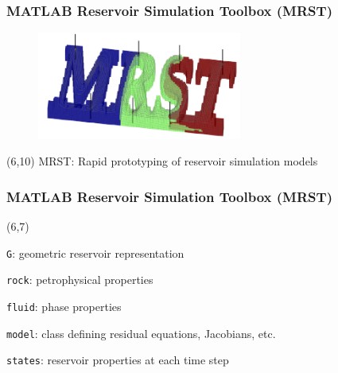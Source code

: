 \documentclass[screen, aspectratio=43]{beamer}
\newcommand{\myitemmark}{\raisebox{.75ex}{\scalebox{.6}{\protect\colorbox{ntnublue}{\protect}}}}
\newenvironment{prettyList}
{
  \begin{list}{\myitemmark}{\leftmargin=1.5em \itemindent=0em} 
}
{
  \end{list}
}
\begin{document}
{
\begin{frame}
  \frametitle{MATLAB Reservoir Simulation Toolbox (MRST)}
  
    \begin{figure}[h]
      \centering
      \vspace{-4em}\hspace{8em}\includegraphics[width = 0.6\textwidth]{figures/misc/mrstlogo}
    \end{figure}
     \begin{textblock}{9.5}(6,10)
    MRST: Rapid prototyping of reservoir simulation models \cite{krogstad2015mrst}
  \end{textblock}

\end{frame}
}

{
\begin{frame}
  \frametitle{MATLAB Reservoir Simulation Toolbox (MRST)}
  
  \begin{textblock}{9.5}(6,7)
    \begin{prettyList}
    \item \texttt{G}: geometric reservoir representation
    \item \texttt{rock}: petrophysical properties
    \item \texttt{fluid}: phase properties
    \item \texttt{model}: class defining residual equations, Jacobians, etc.
    \item \texttt{states}: reservoir properties at each time step
    \end{prettyList}
  \end{textblock}

\end{frame}
}
\end{document}
